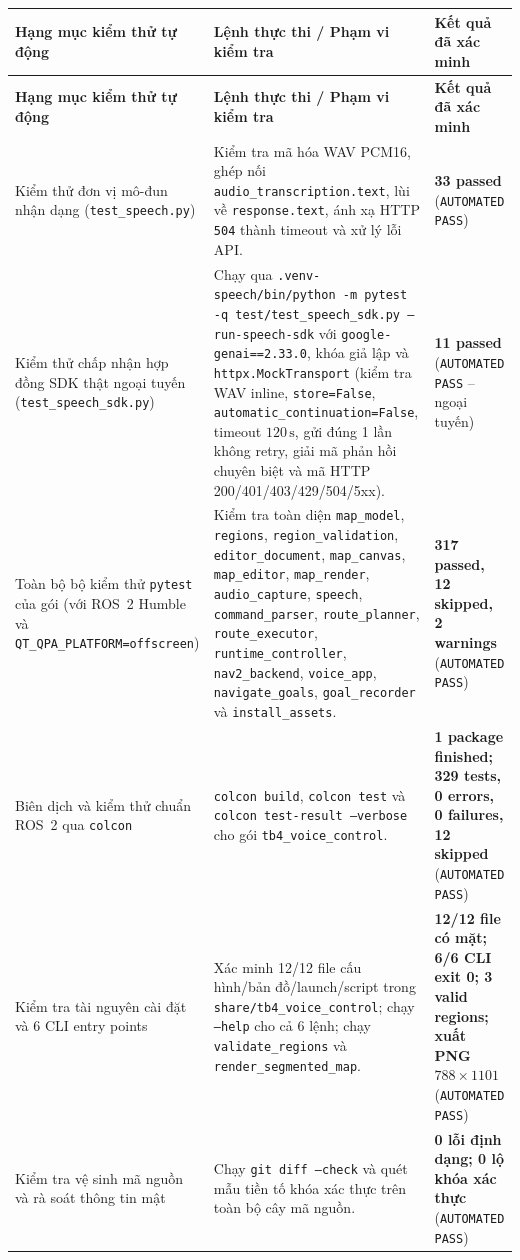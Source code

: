 \begin{longtable}{|p{}|p{}|p{}|}
\hline
\textbf{Hạng mục kiểm thử tự động} & \textbf{Lệnh thực thi / Phạm vi kiểm tra} & \textbf{Kết quả đã xác minh} \\
\hline
\endfirsthead
\hline
\textbf{Hạng mục kiểm thử tự động} & \textbf{Lệnh thực thi / Phạm vi kiểm tra} & \textbf{Kết quả đã xác minh} \\
\hline
\endhead
Kiểm thử đơn vị mô-đun nhận dạng (\texttt{test\_speech.py}) & Kiểm tra mã hóa WAV PCM16, ghép nối \texttt{audio\_transcription.text}, lùi về \texttt{response.text}, ánh xạ HTTP \texttt{504} thành timeout và xử lý lỗi API. & \textbf{33 passed} (\texttt{AUTOMATED PASS}) \\
\hline
Kiểm thử chấp nhận hợp đồng SDK thật ngoại tuyến (\texttt{test\_speech\_sdk.py}) & Chạy qua \texttt{.venv-speech/bin/python -m pytest -q test/test\_speech\_sdk.py --run-speech-sdk} với \texttt{google-genai==2.33.0}, khóa giả lập và \texttt{httpx.MockTransport} (kiểm tra WAV inline, \texttt{store=False}, \texttt{automatic\_continuation=False}, timeout $120\,\text{s}$, gửi đúng 1 lần không retry, giải mã phản hồi chuyên biệt và mã HTTP 200/401/403/429/504/5xx). & \textbf{11 passed} (\texttt{AUTOMATED PASS} -- ngoại tuyến) \\
\hline
Toàn bộ bộ kiểm thử \texttt{pytest} của gói (với ROS~2 Humble và \texttt{QT\_QPA\_PLATFORM=offscreen}) & Kiểm tra toàn diện \texttt{map\_model}, \texttt{regions}, \texttt{region\_validation}, \texttt{editor\_document}, \texttt{map\_canvas}, \texttt{map\_editor}, \texttt{map\_render}, \texttt{audio\_capture}, \texttt{speech}, \texttt{command\_parser}, \texttt{route\_planner}, \texttt{route\_executor}, \texttt{runtime\_controller}, \texttt{nav2\_backend}, \texttt{voice\_app}, \texttt{navigate\_goals}, \texttt{goal\_recorder} và \texttt{install\_assets}. & \textbf{317 passed, 12 skipped, 2 warnings} (\texttt{AUTOMATED PASS}) \\
\hline
Biên dịch và kiểm thử chuẩn ROS~2 qua \texttt{colcon} & \texttt{colcon build}, \texttt{colcon test} và \texttt{colcon test-result --verbose} cho gói \texttt{tb4\_voice\_control}. & \textbf{1 package finished; 329 tests, 0 errors, 0 failures, 12 skipped} (\texttt{AUTOMATED PASS}) \\
\hline
Kiểm tra tài nguyên cài đặt và 6 CLI entry points & Xác minh 12/12 file cấu hình/bản đồ/launch/script trong \texttt{share/tb4\_voice\_control}; chạy \texttt{--help} cho cả 6 lệnh; chạy \texttt{validate\_regions} và \texttt{render\_segmented\_map}. & \textbf{12/12 file có mặt; 6/6 CLI exit 0; 3 valid regions; xuất PNG $788 \times 1101$} (\texttt{AUTOMATED PASS}) \\
\hline
Kiểm tra vệ sinh mã nguồn và rà soát thông tin mật & Chạy \texttt{git diff --check} và quét mẫu tiền tố khóa xác thực trên toàn bộ cây mã nguồn. & \textbf{0 lỗi định dạng; 0 lộ khóa xác thực} (\texttt{AUTOMATED PASS}) \\
\hline
\end{longtable}

